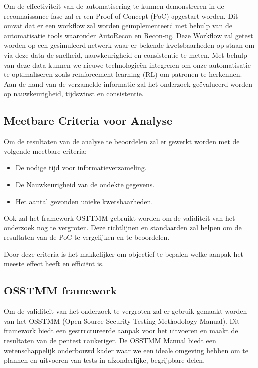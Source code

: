 Om de effectiviteit van de automatisering te kunnen demonstreren in de reconnaissance-fase zal er een Proof of Concept (PoC) opgestart worden.
Dit omvat dat er een workflow zal worden geïmplementeerd met behulp van de automatisatie tools waaronder AutoRecon en Recon-ng. Deze
Workflow zal getest worden op een gesimuleerd netwerk waar er bekende kwetsbaarheden op staan om via deze data de snelheid,
nauwkeurigheid en consistentie te meten. Met behulp van deze data kunnen we nieuwe technologieën integreren om onze automatisatie te optimaliseren
zoals reinforcement learning (RL) om patronen te herkennen.
Aan de hand van de verzamelde informatie zal het onderzoek geëvalueerd worden op nauwkeurigheid, tijdswinst en consistentie.


\newpage
\subsection{Meetbare Criteria voor Analyse}

Om de resultaten van de analyse te beoordelen zal er gewerkt worden met de volgende meetbare criteria:
\begin{itemize}
    \item De nodige tijd voor informatieverzameling.
    \item De Nauwkeurigheid van de ondekte gegevens.
    \item Het aantal gevonden unieke kwetsbaarheden.
\end{itemize}

Ook zal het framework OSTTMM gebruikt worden om de validiteit van het onderzoek nog te vergroten.
Deze richtlijnen en standaarden zal helpen om de resultaten van de PoC te vergelijken en te beoordelen.

Door deze criteria is het makkelijker om objectief te bepalen welke aanpak het meeste effect heeft en efficiënt is.

\subsection{OSSTMM framework}

Om de validiteit van het onderzoek te vergroten zal er gebruik gemaakt worden van het OSSTMM (Open Source Security Testing Methodology Manual). 
Dit framework biedt een gestructureerde aanpak voor het uitvoeren en maakt de resultaten van de pentest naukeriger. 
De OSSTMM Manual biedt een wetenschappelijk onderbouwd kader waar we een ideale omgeving hebben om te plannen en uitvoeren van tests in afzonderlijke, begrijpbare delen.

